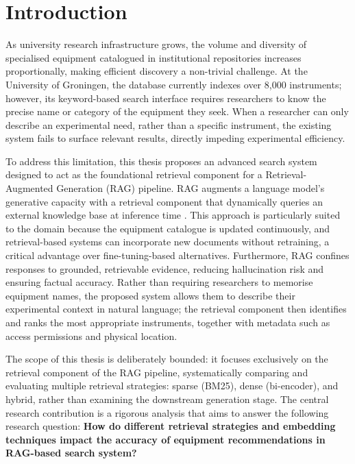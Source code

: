 \section{Introduction}\label{sec:introduction}

As university research infrastructure grows, the volume and diversity of specialised equipment catalogued in institutional repositories increases proportionally, making efficient discovery a non-trivial challenge. At the University of Groningen, the database currently indexes over 8,000 instruments; however, its keyword-based search interface requires researchers to know the precise name or category of the equipment they seek. When a researcher can only describe an experimental need, rather than a specific instrument, the existing system fails to surface relevant results, directly impeding experimental efficiency.

To address this limitation, this thesis proposes an advanced search system designed to act as the foundational retrieval component for a Retrieval-Augmented Generation (RAG) pipeline. RAG augments a language model's generative capacity with a retrieval component that dynamically queries an external knowledge base at inference time \citep{gao2023retrieval, lewis2020retrieval}. This approach is particularly suited to the domain because the equipment catalogue is updated continuously, and retrieval-based systems can incorporate new documents without retraining, a critical advantage over fine-tuning-based alternatives. Furthermore, RAG confines responses to grounded, retrievable evidence, reducing hallucination risk and ensuring factual accuracy. Rather than requiring researchers to memorise equipment names, the proposed system allows them to describe their experimental context in natural language; the retrieval component then identifies and ranks the most appropriate instruments, together with metadata such as access permissions and physical location.

The scope of this thesis is deliberately bounded: it focuses exclusively on the retrieval component of the RAG pipeline, systematically comparing and evaluating multiple retrieval strategies: sparse (BM25), dense (bi-encoder), and hybrid, rather than examining the downstream generation stage. The central research contribution is a rigorous analysis that aims to answer the following research question: \textbf{How do different retrieval strategies and embedding techniques impact the accuracy of equipment recommendations in RAG-based search system?}

